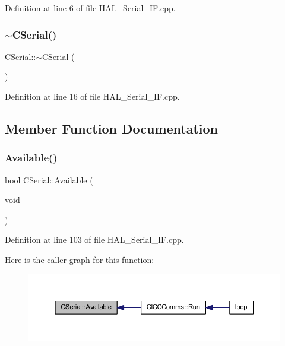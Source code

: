 Definition at line 6 of file H\+A\+L\+\_\+\+Serial\+\_\+\+I\+F.\+cpp.

\mbox{\label{class_c_serial_aff5444dd7e6a9ddc43cbce0e959edf7a}} 
\subsubsection{\texorpdfstring{$\sim$\+C\+Serial()}{~CSerial()}}
{\footnotesize\ttfamily C\+Serial\+::$\sim$\+C\+Serial (\begin{DoxyParamCaption}{ }\end{DoxyParamCaption})}



Definition at line 16 of file H\+A\+L\+\_\+\+Serial\+\_\+\+I\+F.\+cpp.



\subsection{Member Function Documentation}
\mbox{\label{class_c_serial_abb43734223d937a86e7616636ea16024}} 
\subsubsection{\texorpdfstring{Available()}{Available()}}
{\footnotesize\ttfamily bool C\+Serial\+::\+Available (\begin{DoxyParamCaption}\item[{void}]{ }\end{DoxyParamCaption})}



Definition at line 103 of file H\+A\+L\+\_\+\+Serial\+\_\+\+I\+F.\+cpp.

Here is the caller graph for this function\+:
\nopagebreak
\begin{figure}[H]
\begin{center}
\leavevmode
\includegraphics[width=350pt]{class_c_serial_abb43734223d937a86e7616636ea16024_icgraph}
\end{center}
\end{figure}
\mbox{\label{class_c_serial_abad86c07f530569b2ceeea75bda485ad}} 
